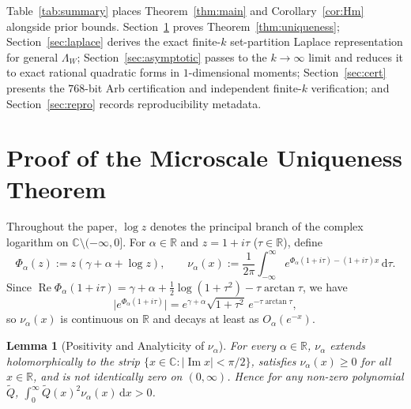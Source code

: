 \documentclass[11pt, reqno]{amsart}
\newtheorem{lemma}{Lemma}[section]
\theoremstyle{remark}
\numberwithin{equation}{section}
\DeclareMathOperator{\re}{Re}
\DeclareMathOperator{\im}{Im}
\newcommand{\R}{\mathbb{R}}
\newcommand{\C}{\mathbb{C}}
\newcommand{\dd}{\,\mathrm{d}}
\begin{document}
Table~\ref{tab:summary} places Theorem~\ref{thm:main} and Corollary~\ref{cor:Hm} alongside prior
bounds. Section~\ref{sec:uniqueness} proves Theorem~\ref{thm:uniqueness}; Section~\ref{sec:laplace}
derives the exact finite-$k$ set-partition Laplace representation for general $\Lambda_W$;
Section~\ref{sec:asymptotic} passes to the $k \to \infty$ limit and reduces it to exact
rational quadratic forms in $1$-dimensional moments; Section~\ref{sec:cert} presents the
$768$-bit Arb certification and independent finite-$k$ verification; and Section~\ref{sec:repro}
records reproducibility metadata.

\section{Proof of the Microscale Uniqueness Theorem}\label{sec:uniqueness}

Throughout the paper, $\log z$ denotes the principal branch of the complex logarithm on
$\C \setminus (-\infty, 0]$. For $\alpha \in \R$ and $z = 1 + i\tau$ ($\tau \in \R$), define
\begin{equation}\label{eq:Phi-nu-def}
\Phi_\alpha(z) := z(\gamma + \alpha + \log z),
\qquad
\nu_\alpha(x) := \frac{1}{2\pi}\int_{-\infty}^\infty e^{\Phi_\alpha(1+i\tau) - (1+i\tau)x}\dd\tau.
\end{equation}
Since $\re\Phi_\alpha(1+i\tau) = \gamma + \alpha + \frac{1}{2}\log(1+\tau^2) - \tau\arctan\tau$,
we have
\begin{equation}\label{eq:Phi-abs}
\bigl|e^{\Phi_\alpha(1+i\tau)}\bigr|
= e^{\gamma+\alpha} \sqrt{1+\tau^2}\, e^{-\tau\arctan\tau},
\end{equation}
so $\nu_\alpha(x)$ is continuous on $\R$ and decays at least as $O_\alpha(e^{-x})$.

\begin{lemma}[Positivity and Analyticity of $\nu_\alpha$]\label{lem:nu-pos}
For every $\alpha \in \R$, $\nu_\alpha$ extends holomorphically to the strip
$\{x \in \C : |\im x| < \pi/2\}$, satisfies $\nu_\alpha(x) \ge 0$ for all $x \in \R$,
and is not identically zero on $(0,\infty)$. Hence for any non-zero polynomial $\widetilde{Q}$,
$\int_0^\infty \widetilde{Q}(x)^2 \nu_\alpha(x)\dd x > 0$.
\end{lemma}
\end{document}
